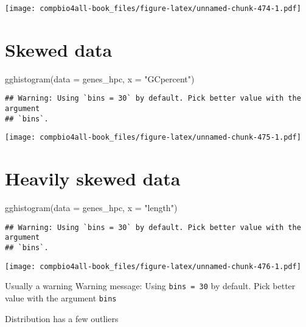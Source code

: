 \documentclass[
]{book}
\newenvironment{Shaded}{\begin{snugshade}}{\end{snugshade}}
\newcommand{\AttributeTok}[1]{\textcolor[rgb]{0.77,0.63,0.00}{#1}}
\newcommand{\FunctionTok}[1]{\textcolor[rgb]{0.00,0.00,0.00}{#1}}
\newcommand{\NormalTok}[1]{#1}
\newcommand{\SpecialCharTok}[1]{\textcolor[rgb]{0.00,0.00,0.00}{#1}}
\newcommand{\StringTok}[1]{\textcolor[rgb]{0.31,0.60,0.02}{#1}}
\begin{document}
\texttt{[image: compbio4all-book\_files/figure-latex/unnamed-chunk-474-1.pdf]}

\hypertarget{skewed-data}{%
\section{Skewed data}\label{skewed-data}}

\begin{Shaded}
\begin{Highlighting}[]
\FunctionTok{gghistogram}\NormalTok{(}\AttributeTok{data =}\NormalTok{ genes\_hpc,}
            \AttributeTok{x =} \StringTok{"GCpercent"}\NormalTok{)}
\end{Highlighting}
\end{Shaded}

\begin{verbatim}
## Warning: Using `bins = 30` by default. Pick better value with the argument
## `bins`.
\end{verbatim}

\texttt{[image: compbio4all-book\_files/figure-latex/unnamed-chunk-475-1.pdf]}

\hypertarget{heavily-skewed-data}{%
\section{Heavily skewed data}\label{heavily-skewed-data}}

\begin{Shaded}
\begin{Highlighting}[]
\FunctionTok{gghistogram}\NormalTok{(}\AttributeTok{data =}\NormalTok{ genes\_hpc,}
            \AttributeTok{x =} \StringTok{"length"}\NormalTok{)}
\end{Highlighting}
\end{Shaded}

\begin{verbatim}
## Warning: Using `bins = 30` by default. Pick better value with the argument
## `bins`.
\end{verbatim}

\texttt{[image: compbio4all-book\_files/figure-latex/unnamed-chunk-476-1.pdf]}

Usually a warning
Warning message:
Using \texttt{bins\ =\ 30} by default. Pick better value with the argument \texttt{bins}

Distribution has a few outliers

\begin{Shaded}
\end{Shaded}
\end{document}
